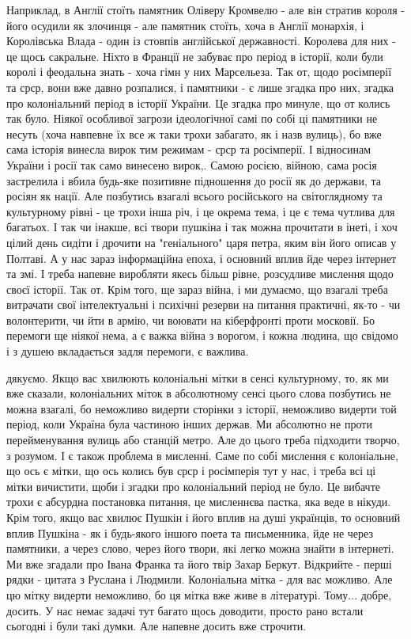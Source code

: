 Наприклад, в Англії стоїть памятник Оліверу Кромвелю - але він стратив короля -
його осудили як злочинця - але памятник стоїть, хоча в Англії монархія, і
Королівська Влада - один із стовпів англійської державності. Королева для них -
це щось сакральне. Ніхто в Франції не забуває про період в історії, коли були
королі і феодальна знать - хоча гімн у них Марсельеза. Так от, щодо росімперії
та срср, вони вже давно розпалися, і памятники - є лише згадка про них, згадка
про колоніальний період в історії України. Це згадка про минуле, що от колись
так було. Ніякої особливої загрози ідеологічної самі по собі ці памятники не
несуть (хоча навпевне їх все ж таки трохи забагато, як і назв вулиць), бо вже
сама історія винесла вирок тим режимам - срср та росімперії. І відносинам
України і росії так само винесено вирок,. Самою росією, війною, сама росія
застрелила і вбила будь-яке позитивне підношення до росії як до держави, та
росіян як нації. Але позбутись взагалі всього російського на світоглядному та
культурному рівні - це трохи інша річ, і це окрема тема, і це є тема чутлива
для багатьох. І так чи інакше, всі твори пушкіна і так можна прочитати в інеті,
і хоч цілий день сидіти і дрочити на "геніального" царя петра, яким він його
описав у Полтаві. А у нас зараз інформаційна епоха, і основний вплив йде через
інтернет та змі. І треба напевне виробляти якесь більш рівне, розсудливе
мислення щодо своєї історії. Так от. Крім того, ще зараз війна, і ми думаємо,
що взагалі треба витрачати свої інтелектуальні і психічні резерви на питання
практичні, як-то - чи волонтерити, чи йти в армію, чи воювати на кіберфронті
проти московії. Бо перемоги ще ніякої нема, а є важка війна з ворогом, і кожна
людина, що свідомо і з душею вкладається задля перемоги, є важлива.

дякуємо. Якщо вас хвилюють колоніальні мітки в сенсі культурному, то, як ми вже
сказали, колоніальних міток в абсолютному сенсі цього слова позбутись не можна
взагалі, бо неможливо видерти сторінки з історії, неможливо видерти той період,
коли Україна була частиною інших держав. Ми абсолютно не проти перейменування
вулиць або станцій метро. Але до цього треба підходити творчо, з розумом. І є
також проблема в мисленні. Саме по собі мислення є колоніальне, що ось є мітки,
що ось колись був срср і росімперія тут у нас, і треба всі ці мітки вичистити,
щоби і згадки про колоніальний період не було. Це вибачте трохи є абсурдна
постановка питання, це мисленнєва пастка, яка веде в нікуди. Крім того, якщо
вас хвилює Пушкін і його вплив на душі українців, то основний вплив Пушкіна -
як і будь-якого іншого поета та письменника, йде не через памятники, а через
слово, через його твори, які легко можна знайти в інтернеті. Ми вже згадали про
Івана Франка та його твір Захар Беркут. Відкрийте - перші рядки - цитата з
Руслана і Людмили. Колоніальна мітка - для вас можливо. Але цю мітку видерти
неможливо, бо ця мітка вже живе в літературі. Тому... добре, досить. У нас
немає задачі тут багато щось доводити, просто рано встали сьогодні і були такі
думки. Але напевне досить вже строчити.

